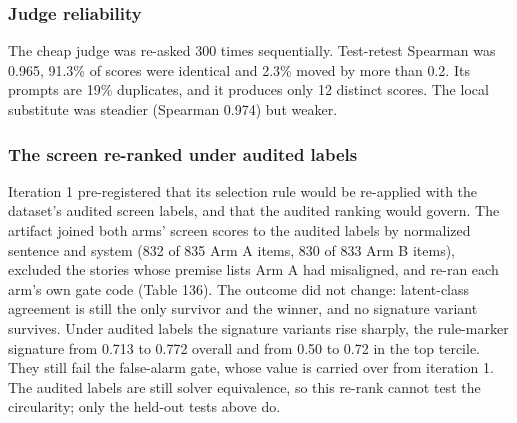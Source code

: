 \documentclass[11pt,letterpaper]{article}
\begin{document}
\subsubsection{Judge reliability}

The cheap judge was re-asked 300 times sequentially. Test-retest Spearman was 0.965, 91.3\% of scores were identical and 2.3\% moved by more than 0.2. Its prompts are 19\% duplicates, and it produces only 12 distinct scores. The local substitute was steadier (Spearman 0.974) but weaker.

\subsubsection{The screen re-ranked under audited labels}

Iteration 1 pre-registered that its selection rule would be re-applied with the dataset's audited screen labels, and that the audited ranking would govern. The artifact joined both arms' screen scores to the audited labels by normalized sentence and system (832 of 835 Arm A items, 830 of 833 Arm B items), excluded the stories whose premise lists Arm A had misaligned, and re-ran each arm's own gate code (Table 136). The outcome did not change: latent-class agreement is still the only survivor and the winner, and no signature variant survives. Under audited labels the signature variants rise sharply, the rule-marker signature from 0.713 to 0.772 overall and from 0.50 to 0.72 in the top tercile. They still fail the false-alarm gate, whose value is carried over from iteration 1. The audited labels are still solver equivalence, so this re-rank cannot test the circularity; only the held-out tests above do.
\end{document}
